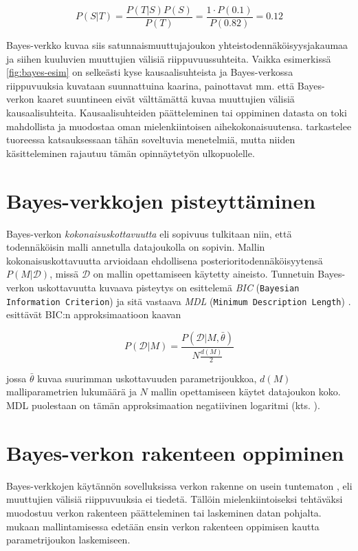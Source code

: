 $$
  P(S|T) = \frac{P(T|S)P(S)}{P(T)} = \frac{1 \cdot P(0.1)}{P(0.82)} = 0.12   
$$

Bayes-verkko kuvaa siis satunnaismuuttujajoukon yhteistodennäköisyysjakaumaa ja siihen kuuluvien muuttujien välisiä riippuvuussuhteita. Vaikka esimerkissä \ref{fig:bayes-esim} on selkeästi kyse kausaalisuhteista ja Bayes-verkossa riippuvuuksia kuvataan suunnattuina kaarina, painottavat mm. \citet{ruggeri_bayesian_2008, myllymaki_bayes-verkkojen_1998} että Bayes-verkon kaaret suuntineen eivät välttämättä kuvaa muuttujien välisiä kausaalisuhteita. Kausaalisuhteiden päätteleminen tai oppiminen datasta on toki mahdollista ja muodostaa oman mielenkiintoisen aihekokonaisuutensa. \citet{vowels_dya_2022} tarkastelee tuoreessa katsauksessaan tähän soveltuvia menetelmiä, mutta niiden käsitteleminen rajautuu tämän opinnäytetyön ulkopuolelle.

\section{Bayes-verkkojen pisteyttäminen}
Bayes-verkon \emph{kokonaisuskottavuutta} eli sopivuus \citep{myllymaki_bayes-verkkojen_1998} tulkitaan niin, että todennäköisin malli annetulla datajoukolla on sopivin. Mallin kokonaisuskottavuutta arvioidaan ehdollisena posterioritodennäköisyytensä $P(M | \mathcal{D})$, missä $\mathcal{D}$ on mallin opettamiseen käytetty aineisto. Tunnetuin Bayes-verkon uskottavuutta kuvaava pisteytys on \citet{schwarz_estimating_1978} esittelemä \emph{BIC} (\texttt{Bayesian Information Criterion}) ja sitä vastaava \emph{MDL} (\texttt{Minimum Description Length}) \citep{ruggeri_bayesian_2008, liu_empirical_2012}. \citet{myllymaki_bayes-verkkojen_1998} esittävät BIC:n approksimaatioon kaavan

$$
P(\mathcal{D}|M) = \frac{P(\mathcal{D}|M, \bar{\theta})}{N{\frac{d(M)}{2}}}
$$

jossa $\bar{\theta}$ kuvaa suurimman uskottavuuden parametrijoukkoa, $d(M)$ malliparametrien lukumäärä ja $N$ mallin opettamiseen käytet datajoukon koko. MDL puolestaan on tämän approksimaation negatiivinen logaritmi (kts. \citet{rissanen_stochastic_1987}).

\section{Bayes-verkon rakenteen oppiminen}
Bayes-verkkojen käytännön sovelluksissa verkon rakenne on usein tuntematon \citep{ruggeri_bayesian_2008}, eli muuttujien välisiä riippuvuuksia ei tiedetä. Tällöin mielenkiintoiseksi tehtäväksi muodostuu verkon rakenteen päätteleminen tai laskeminen datan pohjalta. \citet{myllymaki_bayes-verkkojen_1998} mukaan mallintamisessa edetään ensin verkon rakenteen oppimisen kautta parametrijoukon laskemiseen.

